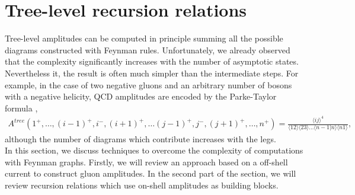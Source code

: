 \section{Tree-level recursion relations}
Tree-level amplitudes can be computed in principle summing all the possible diagrams constructed with Feynman rules. Unfortunately, we already observed that the complexity significantly increases with the number of asymptotic states. Nevertheless it, the result is often much simpler than the intermediate steps. For example, in the case of two negative gluons and an arbitrary number of bosons with a negative helicity, QCD amplitudes are encoded by the Parke-Taylor formula \cite{Parke:1986gb},
\begin{align}
	A^{tree}(1^+,\dots, (i-1)^+,i^-,(i+1)^+,\dots(j-1)^+,j^-,(j+1)^+,\dots, n^+)=\frac{\langle ij \rangle^4}{\langle 12 \rangle \langle 23 \rangle\dots \langle n-1|n\rangle\langle n1 \rangle},	\label{PT}
\end{align}
although the number of diagrams which contribute increases with the legs.\\
In this section, we discuss techniques to overcome the complexity of computations with Feynman graphs. Firstly, we will review an approach based on a off-shell current to construct gluon amplitudes. In the second part of the section, we will review recursion relations which use on-shell amplitudes as building blocks. %
